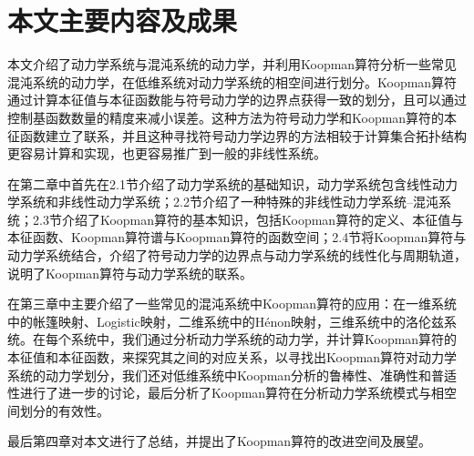 \section{本文主要内容及成果}
本文介绍了动力学系统与混沌系统的动力学，并利用Koopman算符分析一些常见混沌系统的动力学，在低维系统对动力学系统的相空间进行划分。Koopman算符通过计算本征值与本征函数能与符号动力学的边界点获得一致的划分，且可以通过控制基函数数量的精度来减小误差。这种方法为符号动力学和Koopman算符的本征函数建立了联系，并且这种寻找符号动力学边界的方法相较于计算集合拓扑结构更容易计算和实现，也更容易推广到一般的非线性系统。

在第二章中首先在2.1节介绍了动力学系统的基础知识，动力学系统包含线性动力学系统和非线性动力学系统；2.2节介绍了一种特殊的非线性动力学系统--混沌系统；2.3节介绍了Koopman算符的基本知识，包括Koopman算符的定义、本征值与本征函数、Koopman算符谱与Koopman算符的函数空间；2.4节将Koopman算符与动力学系统结合，介绍了符号动力学的边界点与动力学系统的线性化与周期轨道，说明了Koopman算符与动力学系统的联系。

在第三章中主要介绍了一些常见的混沌系统中Koopman算符的应用：在一维系统中的帐篷映射、Logistic映射，二维系统中的H\'{e}non映射，三维系统中的洛伦兹系统。在每个系统中，我们通过分析动力学系统的动力学，并计算Koopman算符的本征值和本征函数，来探究其之间的对应关系，以寻找出Koopman算符对动力学系统的动力学划分，我们还对低维系统中Koopman分析的鲁棒性、准确性和普适性进行了进一步的讨论，最后分析了Koopman算符在分析动力学系统模式与相空间划分的有效性。

最后第四章对本文进行了总结，并提出了Koopman算符的改进空间及展望。


% 
% 
